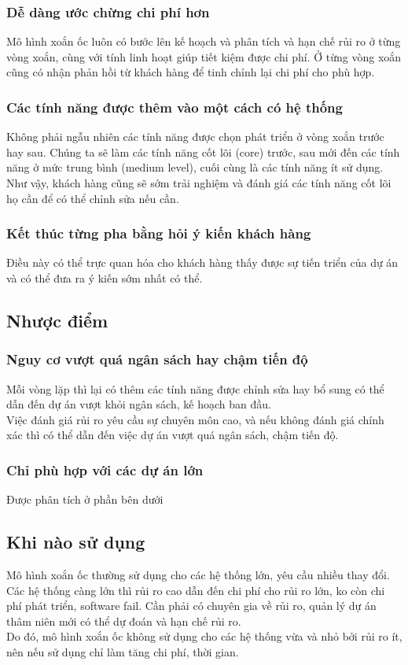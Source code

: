 \documentclass[14pt]{extarticle}
\begin{document}
\subsubsection*{Dễ dàng ước chừng chi phí hơn}
Mô hình xoắn ốc luôn có bước lên kế hoạch và phân tích và hạn chế rủi ro
ở từng vòng xoắn, cùng với tính linh hoạt giúp tiết kiệm được chi phí. Ở từng
vòng xoắn cũng có nhận phản hồi từ khách hàng để tinh chỉnh lại chi phí cho phù
hợp.
\subsubsection*{Các tính năng được thêm vào một cách có hệ thống}
Không phải ngẫu nhiên các tính năng được chọn phát triển ở vòng xoắn trước hay sau.
Chúng ta sẽ làm các tính năng cốt lõi (core) trước, sau mới đến các tính năng ở
mức trung bình (medium level), cuối cùng là các tính năng ít sử dụng.\\
Như vậy, khách hàng cũng sẽ sớm trải nghiệm và đánh giá các tính năng cốt lõi
họ cần để có thể chỉnh sửa nếu cần.
\subsubsection*{Kết thúc từng pha bằng hỏi ý kiến khách hàng}
Điều này có thể trực quan hóa cho khách hàng thấy được sự tiến triển của dự án
và có thể đưa ra ý kiến sớm nhất có thể.

\subsection{Nhược điểm}
\subsubsection*{Nguy cơ vượt quá ngân sách hay chậm tiến độ}
Mỗi vòng lặp thì lại có thêm các tính năng được chỉnh sửa hay bổ sung
có thể dẫn đến dự án vượt khỏi ngân sách, kế hoạch ban đầu.\\
Việc đánh giá rủi ro yêu cầu sự chuyên môn cao, và nếu không đánh giá
chính xác thì có thể dẫn đến việc dự án vượt quá ngân sách, chậm tiến độ.
\subsubsection*{Chỉ phù hợp với các dự án lớn}
Được phân tích ở phần bên dưới
\subsection{Khi nào sử dụng}
Mô hình xoắn ốc thường sử dụng cho các hệ thống lớn, yêu cầu nhiều thay đổi.
Các hệ thống càng lớn thì rủi ro cao dẫn đến chi phí cho rủi ro lớn, ko còn
chi phí phát triển, software fail. Cần phải có chuyên gia về rủi ro, quản lý dự án
thâm niên mới có thể dự đoán và hạn chế rủi ro.\\
Do đó, mô hình xoắn ốc không sử dụng cho các hệ thống vừa và nhỏ bởi rủi ro ít,
nên nếu sử dụng chỉ làm tăng chi phí, thời gian.
\end{document}
